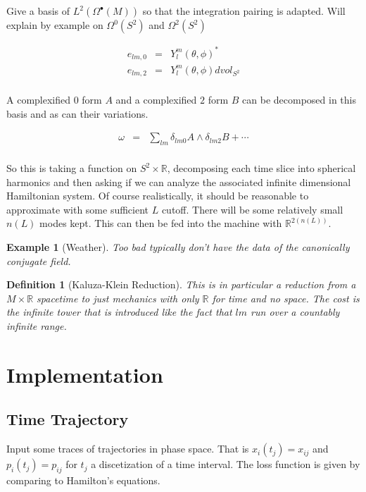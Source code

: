 \documentclass[a4paper,landscape]{article}
\theoremstyle{change}
\newtheorem{definition}[equation]{Definition}
\newtheorem{example}[equation]{Example}
\theoremstyle{nonumberplain}
\numberwithin{equation}{section}
\begin{document}
Give a basis of $L^2 ( \Omega^\bullet (M))$ so that the integration pairing is adapted. Will explain by example on $\Omega^0 (S^2)$ and $\Omega^2 (S^2)$

\begin{eqnarray*}
e_{lm,0} &=& Y_l^m (\theta , \phi)^*\\
e_{lm,2} &=& Y_l^m (\theta , \phi) dvol_{S^2}\\
\end{eqnarray*}

A complexified $0$ form $A$ and a complexified $2$ form $B$ can be decomposed in this basis and as can their variations.

\begin{eqnarray*}
\omega &=& \sum_{lm} \delta_{lm0} A \wedge \delta_{lm2} B + \cdots\\
\end{eqnarray*}

So this is taking a function on $S^2 \times \mathbb{R}$, decomposing each time slice into spherical harmonics and then asking if we can analyze the associated infinite dimensional Hamiltonian system. Of course realistically, it should be reasonable to approximate with some sufficient $L$ cutoff. There will be some relatively small $n(L)$ modes kept. This can then be fed into the machine with $\mathbb{R}^{2(n(L))}$.

\begin{example}[Weather]
Too bad typically don't have the data of the canonically conjugate field.
\end{example}

\begin{definition}[Kaluza-Klein Reduction]
This is in particular a reduction from a $M \times \mathbb{R}$ spacetime to just mechanics with only $\mathbb{R}$ for time and no space. The cost is the infinite tower that is introduced like the fact that $lm$ run over a countably infinite range.
\end{definition}

\section{Implementation}

\subsection{Time Trajectory}

Input some traces of trajectories in phase space. That is $x_i (t_j) = x_{ij}$ and $p_i (t_j)=p_{ij}$ for $t_j$ a discetization of a time interval. The loss function is given by comparing to Hamilton's equations.
\end{document}
